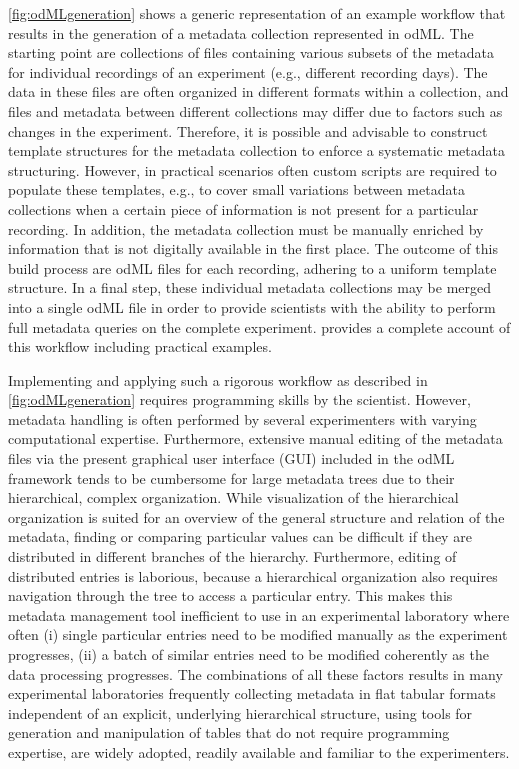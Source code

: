 \cref{fig:odMLgeneration} shows a generic representation of an example workflow that results in the generation of a metadata collection represented in odML. The starting point are collections of files containing various subsets of the metadata for individual recordings of an experiment (e.g., different recording days). The data in these files are often organized in different formats within a collection, and files and metadata between different collections may differ due to factors such as changes in the experiment. Therefore, it is possible and advisable to construct template structures for the metadata collection to enforce a systematic metadata structuring. However, in practical scenarios often custom scripts are required to populate these templates, e.g., to cover small variations between metadata collections when a certain piece of information is not present for a particular recording. In addition, the metadata collection must be manually enriched by information that is not digitally available in the first place. The outcome of this build process are odML files for each recording, adhering to a uniform template structure. In a final step, these individual metadata collections may be merged into a single odML file in order to provide scientists with the ability to perform full metadata queries on the complete experiment. \citet{Zehl_2016} provides a complete account of this workflow including practical examples.

Implementing and applying such a rigorous workflow as described in \cref{fig:odMLgeneration} requires programming skills by the scientist. However, metadata handling is often performed by several experimenters with varying computational expertise. Furthermore, extensive manual editing of the metadata files via the present graphical user interface (GUI) included in the odML framework tends to be cumbersome for large metadata trees due to their hierarchical, complex organization. While visualization of the hierarchical organization is suited for an overview of the general structure and relation of the metadata, finding or comparing particular values can be difficult if they are distributed in different branches of the hierarchy. Furthermore, editing of distributed entries is laborious, because a hierarchical organization also requires navigation through the tree to access a particular entry. This makes this metadata management tool inefficient to use in an experimental laboratory where often (i) single particular entries need to be modified manually as the experiment progresses, (ii) a batch of similar entries need to be modified coherently as the data processing progresses. The combinations of all these factors results in many experimental laboratories frequently collecting metadata in flat tabular formats independent of an explicit, underlying hierarchical structure, using tools for generation and manipulation of tables that do not require programming expertise, are widely adopted, readily available and familiar to the experimenters.

